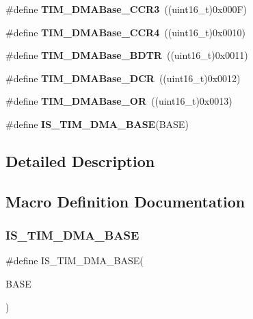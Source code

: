 \begin{DoxyCompactItemize}
\item 
\#define \textbf{ T\+I\+M\+\_\+\+D\+M\+A\+Base\+\_\+\+C\+C\+R3}~((uint16\+\_\+t)0x000\+F)
\item 
\#define \textbf{ T\+I\+M\+\_\+\+D\+M\+A\+Base\+\_\+\+C\+C\+R4}~((uint16\+\_\+t)0x0010)
\item 
\#define \textbf{ T\+I\+M\+\_\+\+D\+M\+A\+Base\+\_\+\+B\+D\+TR}~((uint16\+\_\+t)0x0011)
\item 
\#define \textbf{ T\+I\+M\+\_\+\+D\+M\+A\+Base\+\_\+\+D\+CR}~((uint16\+\_\+t)0x0012)
\item 
\#define \textbf{ T\+I\+M\+\_\+\+D\+M\+A\+Base\+\_\+\+OR}~((uint16\+\_\+t)0x0013)
\item 
\#define \textbf{ I\+S\+\_\+\+T\+I\+M\+\_\+\+D\+M\+A\+\_\+\+B\+A\+SE}(B\+A\+SE)
\end{DoxyCompactItemize}


\subsection{Detailed Description}


\subsection{Macro Definition Documentation}
\mbox{\label{group__TIM__DMA__Base__address_gaf565551f2619b1368fed7ef1ba7414de}} 
\subsubsection{I\+S\+\_\+\+T\+I\+M\+\_\+\+D\+M\+A\+\_\+\+B\+A\+SE}
{\footnotesize\ttfamily \#define I\+S\+\_\+\+T\+I\+M\+\_\+\+D\+M\+A\+\_\+\+B\+A\+SE(\begin{DoxyParamCaption}\item[{}]{B\+A\+SE }\end{DoxyParamCaption})}

